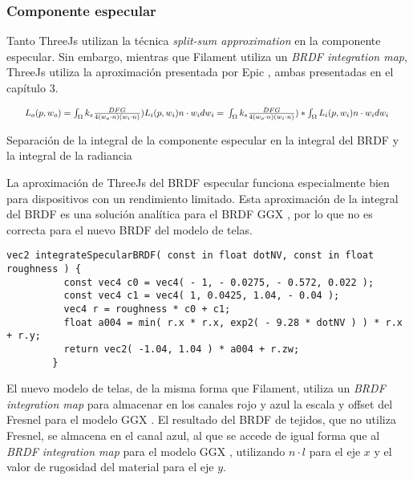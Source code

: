       \singlespacing

    \subsubsection{Componente especular}
      Tanto ThreeJs utilizan la t\'ecnica \textit{split-sum approximation} \autocite{dfgapproximation}
      en la componente especular. Sin embargo, mientras que Filament utiliza un \textit{BRDF integration map},
      ThreeJs utiliza la aproximaci\'on presentada por Epic \autocite{dfgapproximation}, ambas presentadas en
      el cap\'itulo 3.\\

      \begin{eqfloat}[ht]
        \begin{equation}
          \resizebox{0.95\hsize}{!}{%
          $L_o(p, w_o) =
          \int_{\Omega} k_s \frac{DFG}{4(w_o\cdot{n})(w_i\cdot{n})})L_i(p, w_i)n\cdot{w_i}dw_i = \\
          \int_{\Omega} k_s \frac{DFG}{4(w_o\cdot{n})(w_i\cdot{n})}) *
          \int_{\Omega}L_i(p, w_i)n\cdot{w_i}dw_i$   
          }
        \end{equation}
      \caption{Separaci\'on de la integral de la componente especular en la integral del BRDF y la integral de la radiancia }
      \end{eqfloat}
      
      La aproximaci\'on de ThreeJs del BRDF especular funciona especialmente bien para dispositivos con un rendimiento
      limitado. Esta aproximaci\'on de la integral del BRDF es una soluci\'on anal\'itica para el BRDF GGX \autocite{ggx},
      por lo que no es correcta para el nuevo BRDF del modelo de telas.\\

      \begin{lstlisting}[caption=Apromixaci\'on anal\'itica a la integral del BRDF en ThreeJs]
        vec2 integrateSpecularBRDF( const in float dotNV, const in float roughness ) {
          const vec4 c0 = vec4( - 1, - 0.0275, - 0.572, 0.022 );
          const vec4 c1 = vec4( 1, 0.0425, 1.04, - 0.04 );
          vec4 r = roughness * c0 + c1;
          float a004 = min( r.x * r.x, exp2( - 9.28 * dotNV ) ) * r.x + r.y;
          return vec2( -1.04, 1.04 ) * a004 + r.zw;
        }
      \end{lstlisting}
      \singlespacing
      

      El nuevo modelo de telas, de la misma forma que Filament, utiliza un \textit{BRDF integration map} para almacenar
      en los canales rojo y azul la escala y offset del Fresnel para el modelo GGX \autocite{ggx}. El resultado del BRDF de tejidos,
      que no utiliza Fresnel, se almacena en el canal azul, al que se accede de igual forma que al \textit{BRDF integration map} para el modelo GGX \autocite{ggx},
      utilizando $n\cdot{l}$ para el eje $x$ y el valor de rugosidad del material para el eje $y$.


